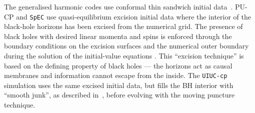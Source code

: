 The generalised harmonic codes use conformal thin sandwich initial
data~\cite{York:1998hy}.  PU-CP and {\tt SpEC} use quasi-equilibrium
excision initial data  where the interior of the black-hole horizons
has been excised from the numerical grid. The presence of black holes
with desired linear momenta and spins is enforced through the boundary
conditions on the excision surfaces and the numerical outer boundary
during the solution of the initial-value equations
\cite{Cook:2001wi,Cook:2004kt,Caudill:2006hw,Pfeiffer:2007yz}. This
``excision technique'' is based on the defining property of black
holes --- the horizons act as causal membranes and information cannot
escape from the inside.  The {\tt UIUC-cp} simulation uses the same
excised initial data, but fills the BH interior with ``smooth junk'',
as described in~\cite{Etienne:2007hr}, before evolving with the moving
puncture technique.   

